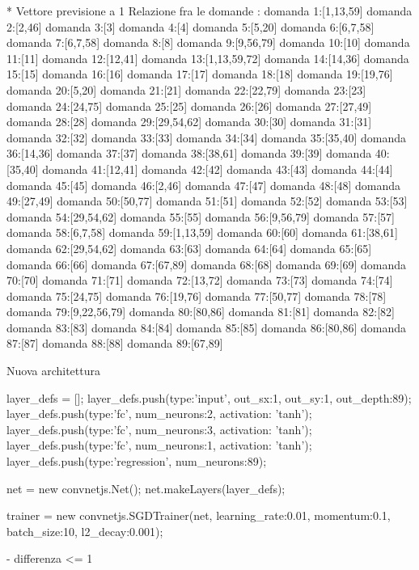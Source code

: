  * Vettore previsione a 1
Relazione fra le domande :
domanda 1:[1,13,59]
domanda 2:[2,46]
domanda 3:[3]
domanda 4:[4]
domanda 5:[5,20]
domanda 6:[6,7,58]
domanda 7:[6,7,58]
domanda 8:[8]
domanda 9:[9,56,79]
domanda 10:[10]
domanda 11:[11]
domanda 12:[12,41]
domanda 13:[1,13,59,72]
domanda 14:[14,36]
domanda 15:[15]
domanda 16:[16]
domanda 17:[17]
domanda 18:[18]
domanda 19:[19,76]
domanda 20:[5,20]
domanda 21:[21]
domanda 22:[22,79]
domanda 23:[23]
domanda 24:[24,75]
domanda 25:[25]
domanda 26:[26]
domanda 27:[27,49]
domanda 28:[28]
domanda 29:[29,54,62]
domanda 30:[30]
domanda 31:[31]
domanda 32:[32]
domanda 33:[33]
domanda 34:[34]
domanda 35:[35,40]
domanda 36:[14,36]
domanda 37:[37]
domanda 38:[38,61]
domanda 39:[39]
domanda 40:[35,40]
domanda 41:[12,41]
domanda 42:[42]
domanda 43:[43]
domanda 44:[44]
domanda 45:[45]
domanda 46:[2,46]
domanda 47:[47]
domanda 48:[48]
domanda 49:[27,49]
domanda 50:[50,77]
domanda 51:[51]
domanda 52:[52]
domanda 53:[53]
domanda 54:[29,54,62]
domanda 55:[55]
domanda 56:[9,56,79]
domanda 57:[57]
domanda 58:[6,7,58]
domanda 59:[1,13,59]
domanda 60:[60]
domanda 61:[38,61]
domanda 62:[29,54,62]
domanda 63:[63]
domanda 64:[64]
domanda 65:[65]
domanda 66:[66]
domanda 67:[67,89]
domanda 68:[68]
domanda 69:[69]
domanda 70:[70]
domanda 71:[71]
domanda 72:[13,72]
domanda 73:[73]
domanda 74:[74]
domanda 75:[24,75]
domanda 76:[19,76]
domanda 77:[50,77]
domanda 78:[78]
domanda 79:[9,22,56,79]
domanda 80:[80,86]
domanda 81:[81]
domanda 82:[82]
domanda 83:[83]
domanda 84:[84]
domanda 85:[85]
domanda 86:[80,86]
domanda 87:[87]
domanda 88:[88]
domanda 89:[67,89]


Nuova architettura 

layer_defs = [];
layer_defs.push({type:'input', out_sx:1, out_sy:1, out_depth:89});
layer_defs.push({type:'fc', num_neurons:2, activation: 'tanh'});
layer_defs.push({type:'fc', num_neurons:3, activation: 'tanh'});
layer_defs.push({type:'fc', num_neurons:1, activation: 'tanh'});
layer_defs.push({type:'regression', num_neurons:89});

net = new convnetjs.Net();
net.makeLayers(layer_defs);

trainer = new convnetjs.SGDTrainer(net, {learning_rate:0.01, momentum:0.1, batch_size:10, l2_decay:0.001});

- differenza <= 1


